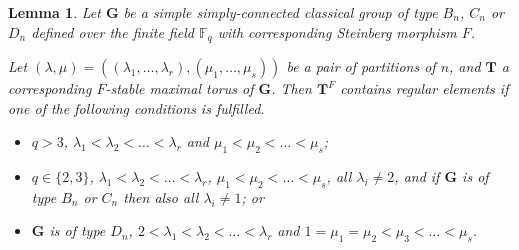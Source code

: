 \documentclass{ert-l}
\newcommand{\FF}{{\mathbb{F}}}
\newcommand{\bG}{{\mathbf{G}}}
\newcommand{\bT}{{\mathbf{T}}}
\let\la=\lambda
\newtheorem{lem}[thm]{Lemma}
\theoremstyle{definition}
\theoremstyle{remark}
\begin{document}
\begin{lem}   \label{lem:regelts}
 Let $\bG$ be a simple simply-connected classical group of type $B_n$, $C_n$
 or $D_n$ defined over the finite field $\FF_q$ with corresponding Steinberg
 morphism $F$.

 Let $(\la,\mu) = ((\la_1, \ldots, \la_r),(\mu_1, \ldots, \mu_s))$ be a
 pair of partitions of $n$, and $\bT$ a corresponding
 $F$-stable maximal torus of $\bG$. Then $\bT^F$ contains regular elements
 if one of the following conditions is fulfilled.
 \begin{itemize}
  \item[(1)] $q>3$, $\la_1 < \la_2 < \ldots < \la_r$ and $\mu_1 < \mu_2 <
    \ldots < \mu_s$;
  \item[(2)] $q \in \{2,3\}$,
    $\la_1 < \la_2 < \ldots < \la_r$, $\mu_1 < \mu_2 <
     \ldots < \mu_s$, all $\la_i \neq 2$, and if $\bG$ is of type $B_n$ or
     $C_n$ then also all $\la_i \neq 1$; or
  \item[(3)] $\bG$ is of type $D_n$, $2 < \la_1 < \la_2 < \ldots < \la_r$ and
    $1 = \mu_1 = \mu_2 < \mu_3 < \ldots < \mu_s$.
 \end{itemize}
\end{lem}
\end{document}
